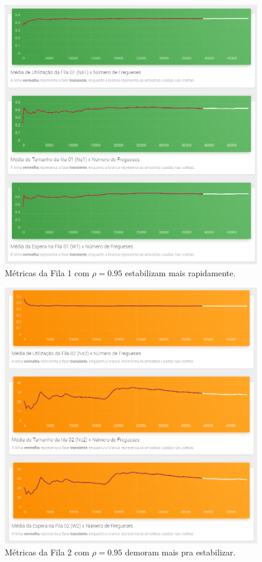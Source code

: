 \documentclass[a4paper,12pt]{report}
\begin{document}
\begin{figure}[H]
\includegraphics[width=1\textwidth]{./graficos/transient/mediasfilas1rho095.png}
\vspace{-10mm}
\caption{Métricas da Fila 1 com $\rho=0.95$ estabilizam mais rapidamente.}
\end{figure}

\begin{figure}[H]
\includegraphics[width=1\textwidth]{./graficos/transient/mediasfilas2rho095.png}
\vspace{-10mm}
\caption{Métricas da Fila 2 com $\rho=0.95$ demoram mais pra estabilizar.}
\end{figure}
\end{document}

